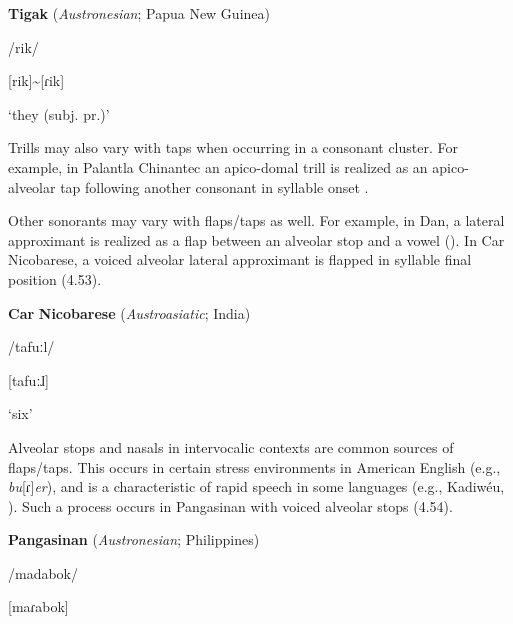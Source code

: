 \ea\label{ex:(4.52)}
  \textbf{Tigak} (\textit{Austronesian}; Papua New Guinea)



/rik/



[rik]{\textasciitilde}[ɾik]



‘they (subj. pr.)’



\citep[14]{Beaumont1979}

\z


Trills may also vary with taps when occurring in a consonant cluster. For example, in Palantla Chinantec an apico-domal trill is realized as an apico-alveolar tap following another consonant in syllable onset \citep[3]{Merrifield1963}. 



  Other sonorants may vary with flaps/taps as well. For example, in Dan, a lateral approximant is realized as a flap between an alveolar stop and a vowel (\citealt{BearthZemp1967}). In Car Nicobarese, a voiced alveolar lateral approximant is flapped in syllable final position (4.53).



\ea\label{ex:(4.53)}
  \textbf{Car} \textbf{Nicobarese} (\textit{Austroasiatic}; India)



/tafuːl/



[tafuːɺ]



‘six’



\citep[45]{Braine1970}

\z


  Alveolar stops and nasals in intervocalic contexts are common sources of flaps/taps. This occurs in certain stress environments in American English (e.g., \textit{bu}[ɾ]\textit{er}), and is a characteristic of rapid speech in some languages (e.g., Kadiwéu, \citealt{Sandalo1997}). Such a process occurs in Pangasinan with voiced alveolar stops (4.54).



\ea\label{ex:(4.54)}
  \textbf{Pangasinan} (\textit{Austronesian}; Philippines)



/madabok/



[maɾabok]



